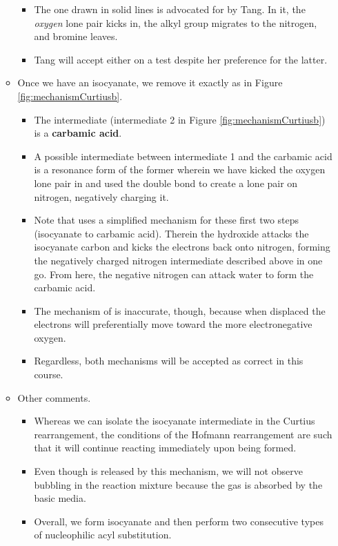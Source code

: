 \documentclass[../notes.tex]{subfiles}
\begin{document}
\begin{itemize}
\begin{itemize}
\begin{itemize}
            \item The one drawn in solid lines is advocated for by Tang. In it, the \emph{oxygen} lone pair kicks in, the alkyl group migrates to the nitrogen, and bromine leaves.
            \item Tang will accept either on a test despite her preference for the latter.
        \end{itemize}
        \item Once we have an isocyanate, we remove it exactly as in Figure \ref{fig:mechanismCurtiusb}.
        \begin{itemize}
            \item The  intermediate (intermediate 2 in Figure \ref{fig:mechanismCurtiusb}) is a \textbf{carbamic acid}.
            \item A possible intermediate between intermediate 1 and the carbamic acid is a resonance form of the former wherein we have kicked the oxygen lone pair in and used the double bond to create a lone pair on nitrogen, negatively charging it.
            \item Note that \textcite{bib:SolomonsEtAl} uses a simplified mechanism for these first two steps (isocyanate to carbamic acid). Therein the hydroxide attacks the isocyanate carbon and kicks the  electrons back onto nitrogen, forming the negatively charged nitrogen intermediate described above in one go. From here, the negative nitrogen can attack water to form the carbamic acid.
            \item The mechanism of \textcite{bib:SolomonsEtAl} is inaccurate, though, because when displaced the electrons will preferentially move toward the more electronegative oxygen.
            \item Regardless, both mechanisms will be accepted as correct in this course.
        \end{itemize}
        \item Other comments.
        \begin{itemize}
            \item Whereas we can isolate the isocyanate intermediate in the Curtius rearrangement, the conditions of the Hofmann rearrangement are such that it will continue reacting immediately upon being formed.
            \item Even though  is released by this mechanism, we will not observe bubbling in the reaction mixture because the gas is absorbed by the basic media.
            \item Overall, we form isocyanate and then perform two consecutive types of nucleophilic acyl substitution.

\end{itemize}
\end{itemize}
\end{itemize}
\end{document}
